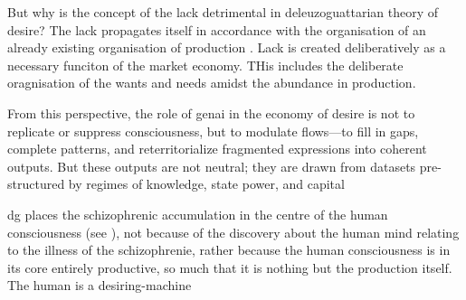 But why is the concept of the lack detrimental in deleuzoguattarian theory of
desire? The lack propagates itself in accordance with the organisation of an
already existing organisation of production \parencite[28]{deleuze1983} . Lack
is created deliberatively as a necessary funciton of the market economy. THis
includes the deliberate oragnisation of the wants and needs amidst the
abundance in production.






\begin{orangebox}
	From this perspective, the role of \gls{genai} in the economy of desire is not to replicate or suppress consciousness, but to modulate flows—to fill in gaps, complete patterns, and reterritorialize fragmented expressions into coherent outputs. But these outputs are not neutral; they are drawn from datasets pre-structured by regimes of knowledge, state power, and capital \parencite[251–254]{deleuze1983}
\end{orangebox}

\Gls{dg} places the schizophrenic accumulation in the centre of the human
consciousness (see \cite[]{deleuze1983}), not because of the discovery about
the human mind relating to the illness of the schizophrenie, rather because the
human consciousness is in its core entirely productive, so much that it is
nothing but the production itself. The human is a desiring-machine




